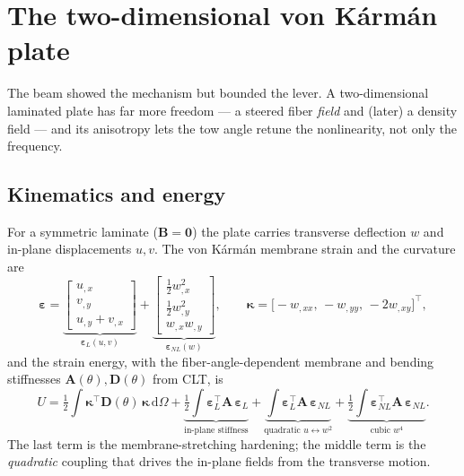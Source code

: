 \documentclass[11pt]{article}
\newcommand{\dd}{\mathrm{d}}
\begin{document}
\section{The two-dimensional von K\'arm\'an plate}\label{sec:plate}

The beam showed the mechanism but bounded the lever. A two-dimensional laminated
plate has far more freedom --- a steered fiber \emph{field} and (later) a density
field --- and its anisotropy lets the tow angle retune the nonlinearity, not only
the frequency.

\subsection{Kinematics and energy}
For a symmetric laminate ($\bm B=\bm 0$) the plate carries transverse deflection
$w$ and in-plane displacements $u,v$. The von K\'arm\'an membrane strain and the
curvature are
\begin{equation}
\bm\varepsilon=\underbrace{\begin{bmatrix}u_{,x}\\ v_{,y}\\ u_{,y}+v_{,x}\end{bmatrix}}_{\bm\varepsilon_L(u,v)}
+\underbrace{\begin{bmatrix}\tfrac12 w_{,x}^2\\ \tfrac12 w_{,y}^2\\ w_{,x}w_{,y}\end{bmatrix}}_{\bm\varepsilon_{NL}(w)},
\qquad
\bm\kappa=\big[-w_{,xx},\,-w_{,yy},\,-2w_{,xy}\big]^{\!\top},
\end{equation}
and the strain energy, with the fiber-angle-dependent membrane and bending
stiffnesses $\bm A(\theta),\bm D(\theta)$ from CLT, is
\begin{equation}
U=\tfrac12\!\int\!\bm\kappa^{\!\top}\bm D(\theta)\,\bm\kappa\,\dd\Omega
 +\underbrace{\tfrac12\!\int\!\bm\varepsilon_L^{\!\top}\bm A\,\bm\varepsilon_L}_{\text{in-plane stiffness}}
 +\underbrace{\int\!\bm\varepsilon_L^{\!\top}\bm A\,\bm\varepsilon_{NL}}_{\text{quadratic }u\!\leftrightarrow\! w^2}
 +\underbrace{\tfrac12\!\int\!\bm\varepsilon_{NL}^{\!\top}\bm A\,\bm\varepsilon_{NL}}_{\text{cubic }w^4}.
\label{eq:plate-energy}
\end{equation}
The last term is the membrane-stretching hardening; the middle term is the
\emph{quadratic} coupling that drives the in-plane fields from the transverse
motion.
\end{document}
